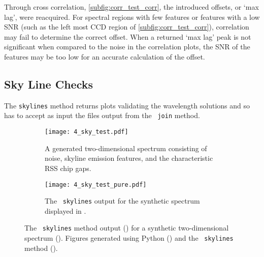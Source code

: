Through cross correlation, \autoref{subfig:corr_test_corr}, the introduced offsets, or `max lag', were reacquired.
For spectral regions with few features or features with a low \gls{SNR} (such as the left most \gls{CCD} region of \autoref{subfig:corr_test_corr}), correlation may fail to determine the correct offset.
When a returned `max lag' peak is not significant when compared to the noise in the correlation plots, the \gls{SNR} of the features may be too low for an accurate calculation of the offset.

\subsection[The \texttt{skylines} Method]{Sky Line Checks} \label{subsec:test_sky}

The \texttt{skylines} method returns plots validating the wavelength solutions and so has to accept as input the files output from the \stops\ \texttt{join} method.

\begin{figure}[tp]
    \centering
    \begin{subfigure}[b]{1.0 \textwidth}
        \centering
        \texttt{[image: 4\_sky\_test.pdf]}
        \caption{A generated two-dimensional spectrum consisting of noise, skyline emission features, and the characteristic \gls{RSS} chip gaps.}
        \label{subfig:sky_test_spec}
    \end{subfigure}
    \hfill
    \begin{subfigure}[b]{1.0 \textwidth}
        \centering
        \texttt{[image: 4\_sky\_test\_pure.pdf]}
        \caption{The \stops\ \texttt{skylines} output for the synthetic spectrum displayed in .}
        \label{subfig:sky_test_pure}
    \end{subfigure}
    \caption{
        The \stops\ \texttt{skylines} method output () for a synthetic two-dimensional spectrum ().
        Figures generated using Python () and the \stops\ \texttt{skylines} method ().
    }
    \label{fig:sky_test}
\end{figure}

